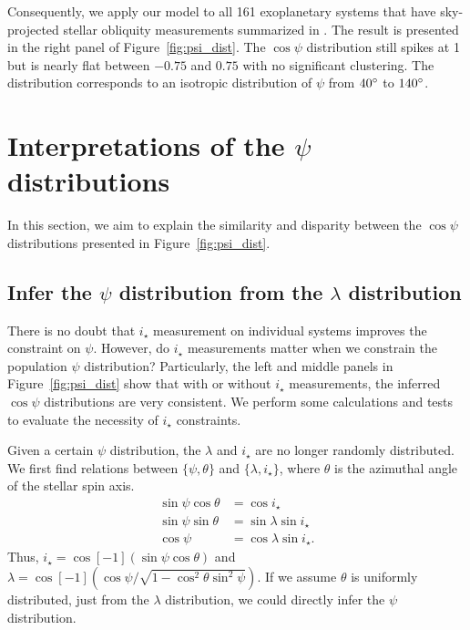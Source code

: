 \documentclass[twocolumn,times]{aastex631}
\newcommand{\numall}{161\xspace}
\begin{document}
Consequently, we apply our model to all \numall exoplanetary systems that have sky-projected stellar obliquity measurements summarized in \cite{Albrecht22}. The result is presented in the right panel of Figure~\ref{fig:psi_dist}. The $\cos{\psi}$ distribution still spikes at 1 but is nearly flat between $-0.75$ and $0.75$ with no significant clustering. The distribution corresponds to an isotropic distribution of $\psi$ from $40\mbox{$^\circ$}$ to $140\mbox{$^\circ$}$.

\section{Interpretations of the \texorpdfstring{$\psi$}{psi} distributions}\label{sec:interpretations}

In this section, we aim to explain the similarity and disparity between the $\cos{\psi}$ distributions presented in Figure~\ref{fig:psi_dist}.

\subsection{Infer the \texorpdfstring{$\psi$}{psi} distribution from the \texorpdfstring{$\lambda$}{lambda} distribution}

There is no doubt that $i_\star$ measurement on individual systems improves the constraint on $\psi$. However, do $i_\star$ measurements matter when we constrain the population $\psi$ distribution? Particularly, the left and middle panels in Figure~\ref{fig:psi_dist} show that with or without $i_\star$ measurements, the inferred $\cos{\psi}$ distributions are very consistent. We perform some calculations and tests to evaluate the necessity of $i_\star$ constraints.

Given a certain $\psi$ distribution, the $\lambda$ and $i_\star$ are no longer randomly distributed. We first find relations between $\{\psi, \theta\}$ and $\{\lambda, i_\star\}$, where $\theta$ is the azimuthal angle of the stellar spin axis.
\begin{align}
    \sin{\psi}\cos{\theta} &= \cos{i_\star} \nonumber\\
    \sin{\psi}\sin{\theta} &= \sin{\lambda}\sin{i_\star} \nonumber\\
    \cos{\psi} &= \cos{\lambda}\sin{i_\star}.
\end{align}
Thus, $i_\star = \cos[-1](\sin{\psi}\cos{\theta})$ and $\lambda = \cos[-1](\cos{\psi}/\sqrt{1-\cos^2{\theta}\sin^2{\psi}})$. If we assume $\theta$ is uniformly distributed, just from the $\lambda$ distribution, we could directly infer the $\psi$ distribution.
\end{document}
